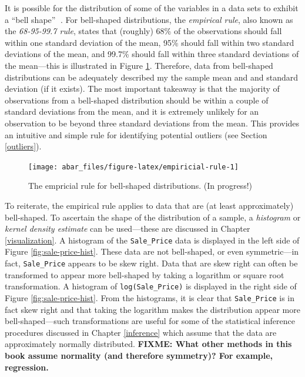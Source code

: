 \documentclass[]{book}
\theoremstyle{definition}
\theoremstyle{definition}
\theoremstyle{definition}
\theoremstyle{remark}
\begin{document}
It is possible for the distribution of some of the variables in a data
sets to exhibit a ``bell shape'' 🔔. For bell-shaped distributions, the
\emph{empirical rule}, also known as the \emph{68-95-99.7 rule}, states
that (roughly) 68\% of the observations should fall within one standard
deviation of the mean, 95\% should fall within two standard deviations
of the mean, and 99.7\% should fall within three standard deviations of
the mean---this is illustrated in Figure \ref{fig:empiricial-rule}.
Therefore, data from bell-shaped distributions can be adequately
described my the sample mean and and standard deviation (if it exists).
The most important takeaway is that the majority of observations from a
bell-shaped distribution should be within a couple of standard
deviations from the mean, and it is extremely unlikely for an
observation to be beyond three standard deviations from the mean. This
provides an intuitive and simple rule for identifying potential outliers
(see Section \ref{outliers}).

\begin{figure}

{\centering \texttt{[image: abar\_files/figure-latex/empiricial-rule-1]} 

}

\caption{The empricial rule for bell-shaped distributions. (In progress!)}\label{fig:empiricial-rule}
\end{figure}

To reiterate, the empirical rule applies to data that are (at least
approximately) bell-shaped. To ascertain the shape of the distribution
of a sample, a \emph{histogram} or \emph{kernel density estimate} can be
used---these are discussed in Chapter \ref{visualization}. A histogram
of the \texttt{Sale\_Price} data is displayed in the left side of Figure
\ref{fig:sale-price-hist}. These data are not bell-shaped, or even
symmetric---in fact, \texttt{Sale\_Price} appears to be skew right. Data
that are skew right can often be transformed to appear more bell-shaped
by taking a logarithm or square root transformation. A histogram of
\texttt{log(Sale\_Price)} is displayed in the right side of Figure
\ref{fig:sale-price-hist}. From the histograms, it is clear that
\texttt{Sale\_Price} is in fact skew right and that taking the logarithm
makes the distribution appear more bell-shaped---such transformations
are useful for some of the statistical inference procedures discussed in
Chapter \ref{inference} which assume that the data are approximately
normally distributed. \textbf{FIXME: What other methods in this book
assume normality (and therefore symmetry)? For example, regression.}
\end{document}
